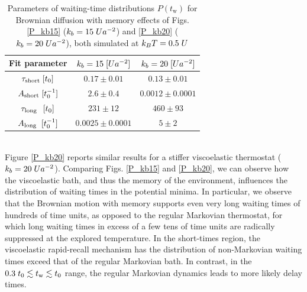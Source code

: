 \begin{table}
\centering 
\begin{tabular}{ccc}
    \toprule
    Fit parameter & $k_b=15\hspace{0.1cm}[Ua^{-2}]$& $k_b=20\hspace{0.1cm}[Ua^{-2}]$\\
    \midrule 
    $\tau_\text{short} \hspace{0.1cm} [t_0]$ & $0.17\pm 0.01$ & $0.13 \pm 0.01$\\[0.5ex]
    $A_\text{short} \hspace{0.1cm} [t_0^{-1}]$ & $2.6 \pm 0.4$ & $0.0012 \pm 0.0001$\\[0.5ex]
    $\tau_\text{long} \hspace{0.25cm} [t_0]$ & $231 \pm 12$ & $460 \pm 93$\\[0.5ex]
    $A_\text{long} \hspace{0.2cm} [t_0^{-1}]$ & $ 0.0025 \pm 0.0001$ & $5 \pm 2$\\
    \bottomrule
\end{tabular}
\caption{Parameters of waiting-time distributions $P(t_\text{w})$ for Brownian diffusion with memory effects of Figs. \ref{P_kb15} 
 ($k_b=15\hspace{0.1cm}Ua^{-2}$) and \ref{P_kb20} 
 ($k_b=20\hspace{0.1cm}Ua^{-2}$), both simulated at $k_BT=0.5\hspace{0.1cm}U$ }
\label{tab:fit_brownian_withmemory}
\end{table}
\\
Figure \ref{P_kb20} reports similar results for a stiffer viscoelastic thermostat ($k_b=20\hspace{0.1cm}Ua^{-2}$). Comparing Figs. \ref{P_kb15} and \ref{P_kb20}, we can observe how the viscoelastic bath, and thus the memory of the environment, influences the distribution of waiting times in the potential minima. In particular, we observe that the Brownian motion with memory supports even very long waiting times of hundreds of time units, as opposed to the regular Markovian thermostat, for which long waiting times in excess of a few tens of time units are radically suppressed at the explored temperature. In the short-times region, the viscoelastic rapid-recall mechanism has the distribution of non-Markovian waiting times exceed that of the regular Markovian bath. In contrast, in the $0.3\hspace{0.1cm}t_0 \lesssim t_\text{w} \lesssim t_0$ range, the regular Markovian dynamics leads to more likely delay times.
